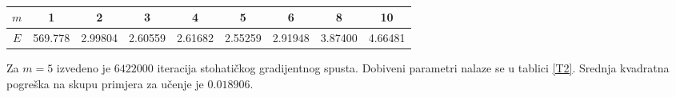 \documentclass[paper=a4, fontsize=11pt]{scrartcl} %
\numberwithin{equation}{section} %
\numberwithin{figure}{section} %
\numberwithin{table}{section} %
\begin{document}
\begin{center}
\begin{table}[h]
\label{T1}
\caption{}
\begin{tabular}{|c|c|c|c|c|c|c|c|c|}
\hline 
$m$ & 1 & 2 & 3 & 4 & 5 & 6 & 8 & 10 \\ 
\hline 
$E$ & 569.778 & 2.99804 & 2.60559 & 2.61682 & 2.55259 & 2.91948 & 3.87400 & 4.66481 \\ 
\hline 
\end{tabular} 
\end{table}
\end{center}

Za $m=5$ izvedeno je $6422000$ iteracija stohatičkog gradijentnog spusta. Dobiveni parametri nalaze se u tablici \ref{T2}. Srednja kvadratna pogreška na skupu primjera za učenje je $0.018906$.
\end{document}
